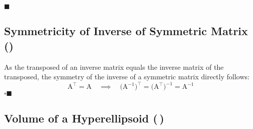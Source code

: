 \documentclass[11pt, a4paper]{scrartcl}
\newcommand{\transposed}{{\!\top\!}}
\newcommand{\mat}[1]{\bm{\mathrm{#1}}}
\newcommand{\eot}{\hfill\(\blacksquare\)}
\newcommand{\qedeot}{\hfill\(\square\blacksquare\)}
\newcommand{\diffstar}{\texorpdfstring{\raisebox{-1pt}{\resizebox{!}{8pt}{\(\star\)}}}{*}}
\newcommand{\onestar}  {(\diffstar)}
\newcommand{\twostar}  {(\diffstar\,\diffstar)}
\begin{document}
			\eot

		\subsection{Symmetricity of Inverse of Symmetric Matrix  \onestar}
			As the transposed of an inverse matrix equals the inverse matrix of the transposed, the symmetry of the inverse of a symmetric matrix directly follows:
			\begin{equation}
				\mat{A}^\transposed = \mat{A}
				\quad\implies\quad
				\big( \mat{A}^{-1} \big)^\transposed
					= \big( \mat{A}^\transposed \big)^{-1}
					= \mat{A}^{-1}
			\end{equation}
			\qedeot

		\subsection{Volume of a Hyperellipsoid  \twostar}
\end{document}
